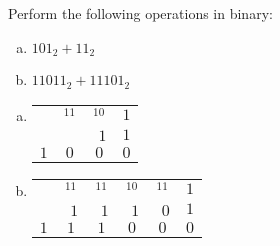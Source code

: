 \documentclass[11pt,letterpaper]{article}
\begin{document}
\newpage





 Perform the following operations in binary:
        \begin{enumerate}[(a)]
        \item $101_2 + 11_2$
        \item $11011_2 + 11101_2$
        \end{enumerate} \pspace

\sol
\begin{enumerate}[(a)]
\item \phantom{.}
	\begin{table}[!ht]
	\centering
	\begin{tabular}{cccc}
	   & $^11$  & $^10$                  & $1$ \\
	   &            & $\phantom{^1}1$ & $1$ \\ \hline
	$1$ & $0$ & $0$                      & $0$
	\end{tabular}
	\end{table}

\item \phantom{.}
	\begin{table}[!ht]
	\centering
	\begin{tabular}{cccccc}
	       & $^11$ & $^11$ & $^10$ & $^11$ & $1$ \\
	       & $\phantom{^1}1$ & $\phantom{^1}1$ & $\phantom{^1}1$ & $\phantom{^1}0$ & $1$ \\ \hline
	$1$ & $1$ & $1$ & $0$ & $0$ & $0$
	\end{tabular}
	\end{table} 
\end{enumerate}
\end{document}
